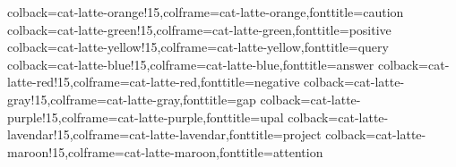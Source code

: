 %
{colback=cat-latte-orange!15,colframe=cat-latte-orange,fonttitle=\bfseries}{caution}
%
{colback=cat-latte-green!15,colframe=cat-latte-green,fonttitle=\bfseries}{positive}
%
{colback=cat-latte-yellow!15,colframe=cat-latte-yellow,fonttitle=\bfseries}{query}
%
{colback=cat-latte-blue!15,colframe=cat-latte-blue,fonttitle=\bfseries}{answer}
%
{colback=cat-latte-red!15,colframe=cat-latte-red,fonttitle=\bfseries}{negative}
%
{colback=cat-latte-gray!15,colframe=cat-latte-gray,fonttitle=\bfseries}{gap}
%
{colback=cat-latte-purple!15,colframe=cat-latte-purple,fonttitle=\bfseries}{upal}
%
{colback=cat-latte-lavendar!15,colframe=cat-latte-lavendar,fonttitle=\bfseries}{project}
%
{colback=cat-latte-maroon!15,colframe=cat-latte-maroon,fonttitle=\bfseries}{attention}

\newcommand{\hlred}[1]{\sethlcolor{soulred}\hl{#1}}
\newcommand{\hlgreen}[1]{\sethlcolor{soulgreen}\hl{#1}}
\newcommand{\hlyellow}[1]{\sethlcolor{soulyellow}\hl{#1}}
\newcommand{\hlblue}[1]{\sethlcolor{soulblue}\hl{#1}}
\newcommand{\hlorange}[1]{\sethlcolor{soulorange}\hl{#1}}
\newcommand{\hlgray}[1]{\sethlcolor{soulgray}\hl{#1}}

\setul{}{1pt} %
\newcommand{\ulred}[1]{\setulcolor{cat-latte-red}\ul{#1}}
\newcommand{\ulgreen}[1]{\setulcolor{cat-latte-green}\ul{#1}}
\newcommand{\ulyellow}[1]{\setulcolor{cat-latte-yellow}\ul{#1}}
\newcommand{\ulblue}[1]{\setulcolor{cat-latte-blue}\ul{#1}}
\newcommand{\ulorange}[1]{\setulcolor{cat-latte-orange}\ul{#1}}
\newcommand{\ulgray}[1]{\setulcolor{cat-latte-gray}\ul{#1}}



